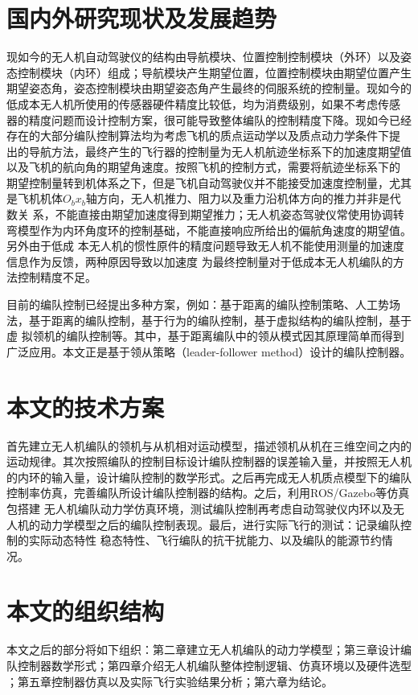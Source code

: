 \section{国内外研究现状及发展趋势}
现如今的无人机自动驾驶仪的结构由导航模块、位置控制控制模块（外环）以及姿态控制模块（内环）组成；导航模块产生期望位置，位置控制模块由期望位置产生
期望姿态角，姿态控制模块由期望姿态角产生最终的伺服系统的控制量。现如今的低成本无人机所使用的传感器硬件精度比较低，均为消费级别，如果不考虑传感
器的精度问题而设计控制方案，很可能导致整体编队的控制精度下降。现如今已经存在的大部分编队控制算法均为考虑飞机的质点运动学以及质点动力学条件下提
出的导航方法，最终产生的飞行器的控制量为无人机航迹坐标系下的加速度期望值以及飞机的航向角的期望角速度。按照飞机的控制方式，需要将航迹坐标系下的
期望控制量转到机体系之下，但是飞机自动驾驶仪并不能接受加速度控制量，尤其是飞机机体$O_bx_b$轴方向，无人机推力、阻力以及重力沿机体方向的推力并非是代数关
系，不能直接由期望加速度得到期望推力；无人机姿态驾驶仪常使用协调转弯模型作为内环角度环的控制基础，不能直接响应所给出的偏航角速度的期望值。另外由于低成
本无人机的惯性原件的精度问题导致无人机不能使用测量的加速度信息作为反馈，两种原因导致以加速度
为最终控制量对于低成本无人机编队的方法控制精度不足。

目前的编队控制已经提出多种方案，例如：基于距离的编队控制策略、人工势场法，基于距离的编队控制，基于行为的编队控制，基于虚拟结构的编队控制，基于虚
拟领机的编队控制等。其中，基于距离编队中的领从模式因其原理简单而得到广泛应用。本文正是基于领从策略（leader-follower method）设计的编队控制器。
\section{本文的技术方案}
首先建立无人机编队的领机与从机相对运动模型，描述领机从机在三维空间之内的运动规律。其次按照编队的控制目标设计编队控制器的误差输入量，并按照无人机
的内环的输入量，设计编队控制的数学形式。之后再完成无人机质点模型下的编队控制率仿真，完善编队所设计编队控制器的结构。之后，利用ROS/Gazebo等仿真包搭建
无人机编队动力学仿真环境，测试编队控制再考虑自动驾驶仪内环以及无人机的动力学模型之后的编队控制表现。最后，进行实际飞行的测试：记录编队控制的实际动态特性
稳态特性、飞行编队的抗干扰能力、以及编队的能源节约情况。
\section{本文的组织结构}
本文之后的部分将如下组织：第二章建立无人机编队的动力学模型；第三章设计编队控制器数学形式；第四章介绍无人机编队整体控制逻辑、仿真环境以及硬件选型
；第五章控制器仿真以及实际飞行实验结果分析；第六章为结论。